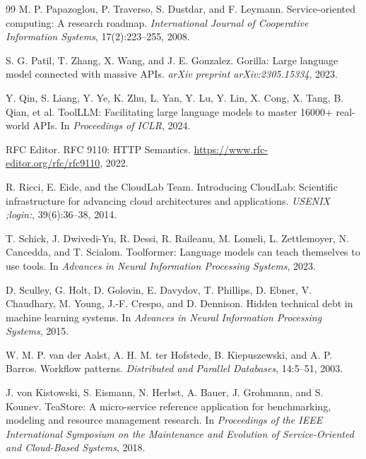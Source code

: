 \documentclass[5p,times]{elsarticle}
\begin{document}
\begin{thebibliography}{99}
M. P. Papazoglou, P. Traverso, S. Dustdar, and F. Leymann.
\newblock Service-oriented computing: A research roadmap.
\newblock \emph{International Journal of Cooperative Information Systems}, 17(2):223--255, 2008.

S. G. Patil, T. Zhang, X. Wang, and J. E. Gonzalez.
\newblock Gorilla: Large language model connected with massive APIs.
\newblock \emph{arXiv preprint arXiv:2305.15334}, 2023.

Y. Qin, S. Liang, Y. Ye, K. Zhu, L. Yan, Y. Lu, Y. Lin, X. Cong, X. Tang, B. Qian, et al.
\newblock ToolLLM: Facilitating large language models to master 16000+ real-world APIs.
\newblock In \emph{Proceedings of ICLR}, 2024.

RFC Editor.
\newblock RFC 9110: HTTP Semantics.
\newblock \url{https://www.rfc-editor.org/rfc/rfc9110}, 2022.

R. Ricci, E. Eide, and the CloudLab Team.
\newblock Introducing CloudLab: Scientific infrastructure for advancing cloud architectures and applications.
\newblock \emph{USENIX ;login:}, 39(6):36--38, 2014.

T. Schick, J. Dwivedi-Yu, R. Dessi, R. Raileanu, M. Lomeli, L. Zettlemoyer, N. Cancedda, and T. Scialom.
\newblock Toolformer: Language models can teach themselves to use tools.
\newblock In \emph{Advances in Neural Information Processing Systems}, 2023.

D. Sculley, G. Holt, D. Golovin, E. Davydov, T. Phillips, D. Ebner, V. Chaudhary, M. Young, J.-F. Crespo, and D. Dennison.
\newblock Hidden technical debt in machine learning systems.
\newblock In \emph{Advances in Neural Information Processing Systems}, 2015.

W. M. P. van der Aalst, A. H. M. ter Hofstede, B. Kiepuszewski, and A. P. Barros.
\newblock Workflow patterns.
\newblock \emph{Distributed and Parallel Databases}, 14:5--51, 2003.

J. von Kistowski, S. Eismann, N. Herbst, A. Bauer, J. Grohmann, and S. Kounev.
\newblock TeaStore: A micro-service reference application for benchmarking, modeling and resource management research.
\newblock In \emph{Proceedings of the IEEE International Symposium on the Maintenance and Evolution of Service-Oriented and Cloud-Based Systems}, 2018.


\end{thebibliography}
\end{document}
